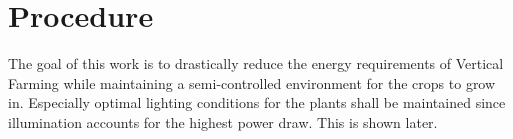 







\section{Procedure}
The goal of this work is to drastically reduce the energy requirements of Vertical Farming while maintaining a semi-controlled environment for the crops to grow in.
Especially optimal lighting conditions for the plants shall be maintained since illumination accounts for the highest power draw.
This is shown later.

